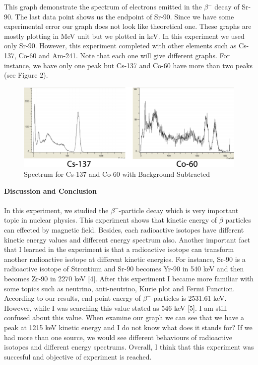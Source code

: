 \documentclass[a4paper,12pt]{article}
\begin{document}
This graph demonstrate the spectrum of electrons emitted in the $\beta^{-}$ decay of Sr-90. The last data point shows us the endpoint of Sr-90. Since we have some experimental error our graph does not look like theoretical one. These graphs are mostly plotting in MeV unit but we plotted in keV. In this experiment we used only Sr-90. However, this experiment completed with other elements such as Cs-137, Co-60 and Am-241. Note that each one will give different graphs. For instance, we have only one peak but Cs-137 and Co-60 have more than two peaks (see Figure 2).
\begin{figure}[h!]
\centering
\includegraphics[width=0.7\linewidth, height=0.2\textheight]{21321}
\caption{Spectrum for Cs-137 and Co-60 with Background Subtracted}
\label{fig:21321}
\end{figure}

\newpage
\textbf{Discussion and Conclusion}\\\\
In this experiment, we studied the $\beta^{-}$-particle decay which is very important topic in nuclear physics. This experiment shows that kinetic energy of $\beta$ particles can effected by magnetic field. Besides, each radioactive isotopes have different kinetic energy values and different energy spectrum also. Another important fact that I learned in the experiment is that a radioactive isotope can transform another radioactive isotope at different kinetic energies. For instance, Sr-90 is a radioactive isotope of Strontium and Sr-90 becomes Yr-90 in 540 keV and then becomes Zr-90 in 2270 keV [4]. After this experiment I became more familiar with some topics such as neutrino, anti-neutrino, Kurie plot and Fermi Function. According to our results, end-point energy of $\beta^{-}$-particles is 2531.61 keV. However, while I was searching this value stated as 546 keV [5]. I am still confused about this value. When examine our graph we can see that we have a peak at 1215 keV kinetic energy and I do not know what does it stands for? If we had more than one source, we would see different behaviours of radioactive isotopes and different energy spectrums. Overall, I think that this experiment was succesful and objective of experiment is reached.\\\\\\
\end{document}
